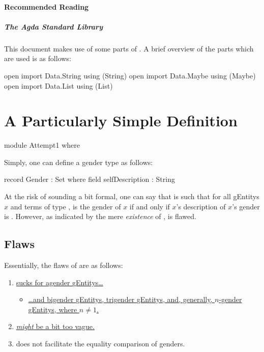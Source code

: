 \documentclass{article}
\begin{document}
\paragraph{Recommended Reading}
\subparagraph{The Agda Standard Library}
This document makes use of some parts of \textcite{agdaStdlib}.  A brief overview of the parts which are used is as follows:

\begin{code}
open import Data.String using (String)
open import Data.Maybe using (Maybe)
open import Data.List using (List)
\end{code}

\section{A Particularly Simple Definition}

\begin{code}
module Attempt1 where
\end{code}

Simply, one can define a gender type  as follows:

\begin{code}
  record Gender : Set where
    field
      selfDescription : String
\end{code}

At the risk of sounding a bit formal, one can say that  is such that for all \glspl{gEntity} \(x\) and terms  of type ,  is the gender of \(x\) if and only if \(x\)'s description of \(x\)'s gender is  .  However, as indicated by the mere \emph{existence} of ,  is flawed.

\subsection{Flaws}\label{sec:gender1flaws}
Essentially, the flaws of  are as follows:

\begin{enumerate}
  \item \hyperref[sec:gender1non1gender]{ sucks for agender \glspl{gEntity}\ldots{}\label{enum:gender1agender}}
  \begin{itemize}
    \item \hyperref[sec:gender1non1gender]{\ldots and bigender \glspl{gEntity}, trigender \glspl{gEntity}, and, generally, \(n\)-gender \glspl{gEntity}, where \(n \neq 1\).}
  \end{itemize}
  \item \hyperref[sec:gender1vagueness]{ \emph{might} be a bit too vague.}
  \item {} does not facilitate the equality comparison of genders.
\end{enumerate}
\end{document}

